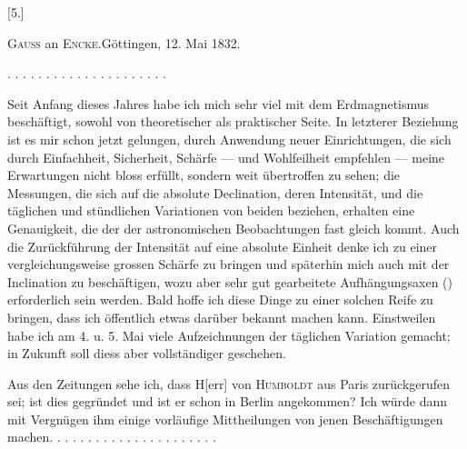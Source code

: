 \clearpage\begingroup{}
\begin{center}[5.]\end{center}
\begin{center}\textsc{Gauss} an \textsc{Encke}.\quad Göttingen, 12. Mai 1832.\end{center}
\noindent . . . . . . . . . . . . . . . . . . . . .\par
\indent Seit Anfang dieses Jahres habe ich mich sehr viel mit dem Erdmagnetismus
beschäftigt, sowohl von theoretischer als praktischer Seite. In letzterer
Beziehung ist es mir schon jetzt gelungen, durch Anwendung neuer Einrichtungen,
die sich durch Einfachheit, Sicherheit, Schärfe — und Wohlfeilheit
empfehlen — meine Erwartungen nicht bloss erfüllt, sondern weit übertroffen
zu sehen; die Messungen, die sich auf die absolute Declination, deren Intensität,
und die täglichen und stündlichen Variationen von beiden beziehen,
erhalten eine Genauigkeit, die der der astronomischen Beobachtungen fast
gleich kommt. Auch die Zurückführung der Intensität auf eine absolute Einheit
denke ich zu einer vergleichungsweise grossen Schärfe zu bringen und
späterhin mich auch mit der Inclination zu beschäftigen, wozu aber sehr gut
gearbeitete Aufhängungsaxen () erforderlich sein werden.
Bald hoffe ich diese Dinge zu einer solchen Reife zu bringen, dass ich öffentlich
etwas darüber bekannt machen kann. Einstweilen habe ich am 4. u. 5.
Mai viele Aufzeichnungen der täglichen Variation gemacht; in Zukunft soll
diess aber vollständiger geschehen.

Aus den Zeitungen sehe ich, dass H[err] von \textsc{Humboldt} aus Paris zurückgerufen
sei; ist dies gegründet und ist er schon in Berlin angekommen? Ich
würde dann mit Vergnügen ihm einige vorläufige Mittheilungen von jenen
Beschäftigungen machen. . . . . . . . . . . . . . . . . . . . . .
\clearpage\endgroup
